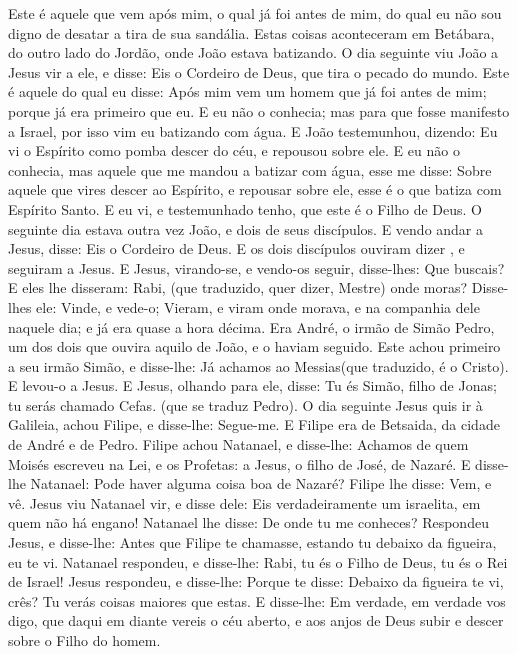 {Este é aquele que vem após mim, o qual já foi antes de mim, do qual eu não sou digno de desatar a tira de sua sandália.
Estas coisas aconteceram em Betábara, do outro lado do Jordão, onde João estava batizando.
O dia seguinte viu João a Jesus vir a ele, e disse: Eis o Cordeiro de Deus, que tira o pecado do mundo.
Este é aquele do qual eu disse: Após mim vem um homem que já foi antes de mim; porque já era primeiro que eu.
E eu não o conhecia; mas para que fosse manifesto a Israel, por isso vim eu batizando com água.
E João testemunhou, dizendo: Eu vi o Espírito como pomba descer do céu, e repousou sobre ele.
E eu não o conhecia, mas aquele que me mandou a batizar com água, esse me disse: Sobre aquele que vires descer ao Espírito, e repousar sobre ele, esse é o que batiza com Espírito Santo.
E eu
{} vi, e testemunhado tenho, que este é o Filho de Deus.
O seguinte dia estava outra vez
{} João, e dois de seus discípulos.
E vendo
{} andar a Jesus, disse: Eis o Cordeiro de Deus.
E os dois discípulos ouviram{} dizer
{} , e seguiram a Jesus.
E Jesus, virando-se, e vendo-os seguir, disse-lhes: Que buscais? E eles lhe disseram: Rabi, (que traduzido, quer dizer, Mestre) onde moras?
Disse-lhes ele: Vinde, e vede-o; Vieram, e viram onde morava, e na companhia dele naquele dia; e já era quase a hora décima.
Era André, o irmão de Simão Pedro, um dos dois que ouvira aquilo de João, e o haviam seguido.
Este achou primeiro a seu irmão Simão, e disse-lhe: Já achamos ao Messias(que traduzido, é o Cristo).
E levou-o a Jesus. E Jesus, olhando para ele, disse: Tu és Simão, filho de Jonas; tu serás chamado Cefas. (que se traduz Pedro).
O dia seguinte Jesus quis ir à Galileia, achou Filipe, e disse-lhe: Segue-me.
E Filipe era de Betsaida, da cidade de André e de Pedro.
Filipe achou Natanael, e disse-lhe: Achamos
{} de quem Moisés escreveu na Lei, e os Profetas: a Jesus, o filho de José, de Nazaré.
E disse-lhe Natanael: Pode haver alguma coisa boa de Nazaré? Filipe lhe disse: Vem, e vê.
Jesus viu Natanael vir, e disse dele: Eis verdadeiramente um israelita, em quem não há engano!
Natanael lhe disse: De onde tu me conheces? Respondeu Jesus, e disse-lhe: Antes que Filipe te chamasse, estando tu debaixo da figueira, eu te vi.
Natanael respondeu, e disse-lhe: Rabi, tu és o Filho de Deus, tu és o Rei de Israel!
Jesus respondeu, e disse-lhe: Porque te disse: Debaixo da figueira te vi, crês? Tu verás coisas maiores que estas.
E disse-lhe: Em verdade, em verdade vos digo, que daqui em diante vereis o céu aberto, e aos anjos de Deus subir e descer sobre o Filho do homem.

}
